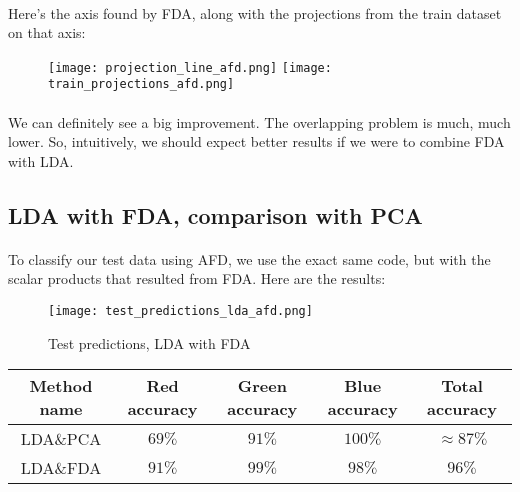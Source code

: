 \paragraph{}
Here's the axis found by FDA, along with the projections from the train dataset on that axis:

\begin{figure}[!h]
    \centering
    \hspace{-1cm}%
    \texttt{[image: projection\_line\_afd.png]}
    \texttt{[image: train\_projections\_afd.png]}
    
    \begin{minipage}[t]{.5\textwidth}
    \centering
    \end{minipage}
    
    \begin{minipage}[t]{.5\textwidth}
    \centering
    \end{minipage}
\end{figure}

\paragraph{}
We can definitely see a big improvement.
The overlapping problem is much, much lower.
So, intuitively, we should expect better results if we were to combine FDA with LDA.

\clearpage

\subsection{LDA with FDA, comparison with PCA}
\paragraph{}
To classify our test data using AFD, we use the exact same code, but with the scalar products that resulted from FDA.
Here are the results:

\begin{figure}[H]
    \centering
    \texttt{[image: test\_predictions\_lda\_afd.png]}
    \caption{Test predictions, LDA with FDA}
\end{figure}

\begin{center}
    \begin{tabular}{ |c|c|c|c|c| }
        \hline
        Method name & Red accuracy & Green accuracy & Blue accuracy & Total accuracy \\
        \hline
        LDA\&PCA & $69\%$ & $91\%$ & $100\%$ & $\approx 87\%$ \\
        \hline
        LDA\&FDA & $91\%$ & $99\%$ & $98\%$ & $96\%$ \\
        \hline
    \end{tabular}
\end{center}

